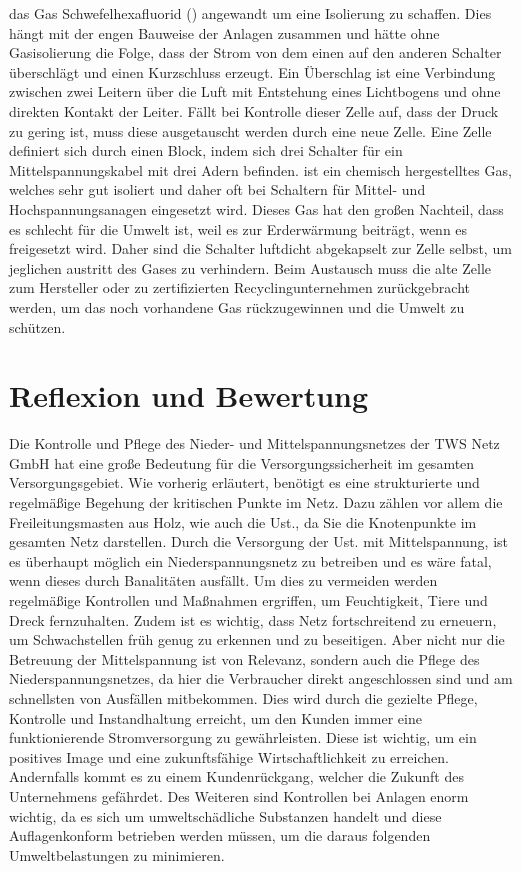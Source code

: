 das Gas Schwefelhexafluorid () angewandt um eine Isolierung zu schaffen. Dies hängt mit der engen Bauweise der Anlagen zusammen und hätte ohne 
Gasisolierung die Folge, dass der Strom von dem einen auf den anderen Schalter überschlägt und einen Kurzschluss erzeugt. Ein Überschlag ist eine 
Verbindung zwischen zwei Leitern über die Luft mit Entstehung eines Lichtbogens und ohne direkten Kontakt der Leiter. Fällt bei Kontrolle dieser  
Zelle auf, dass der Druck zu gering ist, muss diese ausgetauscht werden durch eine neue Zelle. Eine Zelle definiert sich durch einen Block, indem sich 
drei Schalter für ein Mittelspannungskabel mit drei Adern befinden.  ist ein chemisch hergestelltes Gas, welches sehr gut isoliert und daher oft 
bei Schaltern für Mittel- und Hochspannungsanagen eingesetzt wird. Dieses Gas hat den großen Nachteil, dass es schlecht für die Umwelt ist, weil es 
zur Erderwärmung beiträgt, wenn es freigesetzt wird. Daher sind die  Schalter luftdicht abgekapselt zur Zelle selbst, um jeglichen austritt des 
Gases zu verhindern. Beim Austausch muss die alte Zelle zum Hersteller oder zu zertifizierten Recyclingunternehmen zurückgebracht werden, um das 
noch vorhandene Gas rückzugewinnen und die Umwelt zu schützen. 

\section{Reflexion und Bewertung}

Die Kontrolle und Pflege des Nieder- und Mittelspannungsnetzes der TWS Netz GmbH hat eine große Bedeutung für die Versorgungssicherheit im gesamten 
Versorgungsgebiet. Wie vorherig erläutert, benötigt es eine strukturierte und regelmäßige Begehung der kritischen Punkte im Netz. Dazu zählen vor allem 
die Freileitungsmasten aus Holz, wie auch die Ust., da Sie die Knotenpunkte im gesamten Netz darstellen. Durch die Versorgung der Ust. mit Mittelspannung, 
ist es überhaupt möglich ein Niederspannungsnetz zu betreiben und es wäre fatal, wenn dieses durch Banalitäten ausfällt. Um dies zu vermeiden werden 
regelmäßige Kontrollen und Maßnahmen ergriffen, um \zB Feuchtigkeit, Tiere und Dreck fernzuhalten. Zudem ist es wichtig, dass Netz fortschreitend zu 
erneuern, um Schwachstellen früh genug zu erkennen und zu beseitigen. Aber nicht nur die Betreuung der Mittelspannung ist von Relevanz, sondern auch 
die Pflege des Niederspannungsnetzes, da hier die Verbraucher direkt angeschlossen sind und am schnellsten von Ausfällen mitbekommen. Dies wird durch 
die gezielte Pflege, Kontrolle und Instandhaltung erreicht, um den Kunden immer eine funktionierende Stromversorgung zu gewährleisten. Diese ist 
wichtig, um ein positives Image und eine zukunftsfähige Wirtschaftlichkeit zu erreichen. Andernfalls kommt es zu einem Kundenrückgang, welcher die Zukunft
des Unternehmens gefährdet. Des Weiteren sind Kontrollen bei  Anlagen enorm wichtig, da es sich um umweltschädliche Substanzen handelt und 
diese Auflagenkonform betrieben werden müssen, um die daraus folgenden Umweltbelastungen zu minimieren. 

\clearpage
